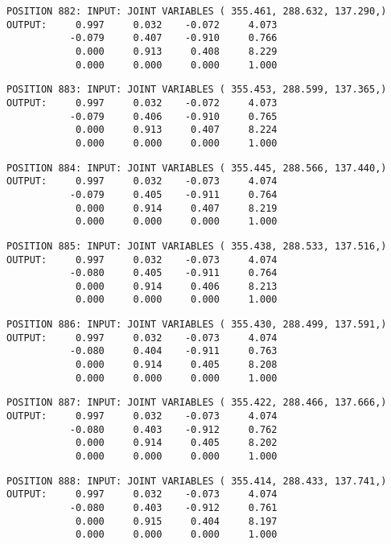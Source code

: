 \begin{verbatim}
POSITION 882: INPUT: JOINT VARIABLES ( 355.461, 288.632, 137.290,)
OUTPUT:     0.997     0.032    -0.072     4.073
           -0.079     0.407    -0.910     0.766
            0.000     0.913     0.408     8.229
            0.000     0.000     0.000     1.000
\end{verbatim} \pagebreak[1]\begin{verbatim}
POSITION 883: INPUT: JOINT VARIABLES ( 355.453, 288.599, 137.365,)
OUTPUT:     0.997     0.032    -0.072     4.073
           -0.079     0.406    -0.910     0.765
            0.000     0.913     0.407     8.224
            0.000     0.000     0.000     1.000
\end{verbatim} \pagebreak[1]\begin{verbatim}
POSITION 884: INPUT: JOINT VARIABLES ( 355.445, 288.566, 137.440,)
OUTPUT:     0.997     0.032    -0.073     4.074
           -0.079     0.405    -0.911     0.764
            0.000     0.914     0.407     8.219
            0.000     0.000     0.000     1.000
\end{verbatim} \pagebreak[1]\begin{verbatim}
POSITION 885: INPUT: JOINT VARIABLES ( 355.438, 288.533, 137.516,)
OUTPUT:     0.997     0.032    -0.073     4.074
           -0.080     0.405    -0.911     0.764
            0.000     0.914     0.406     8.213
            0.000     0.000     0.000     1.000
\end{verbatim} \pagebreak[1]\begin{verbatim}
POSITION 886: INPUT: JOINT VARIABLES ( 355.430, 288.499, 137.591,)
OUTPUT:     0.997     0.032    -0.073     4.074
           -0.080     0.404    -0.911     0.763
            0.000     0.914     0.405     8.208
            0.000     0.000     0.000     1.000
\end{verbatim} \pagebreak[1]\begin{verbatim}
POSITION 887: INPUT: JOINT VARIABLES ( 355.422, 288.466, 137.666,)
OUTPUT:     0.997     0.032    -0.073     4.074
           -0.080     0.403    -0.912     0.762
            0.000     0.914     0.405     8.202
            0.000     0.000     0.000     1.000
\end{verbatim} \pagebreak[1]\begin{verbatim}
POSITION 888: INPUT: JOINT VARIABLES ( 355.414, 288.433, 137.741,)
OUTPUT:     0.997     0.032    -0.073     4.074
           -0.080     0.403    -0.912     0.761
            0.000     0.915     0.404     8.197
            0.000     0.000     0.000     1.000
\end{verbatim} \pagebreak[1]\begin{verbatim}

\end{verbatim}
